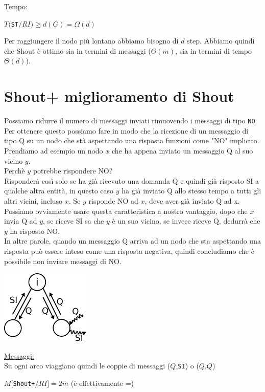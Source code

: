 \underline{Tempo:}
\begin{center}
    $T($\texttt{ST}$/RI) \geq d(G) = \Omega(d)$
\end{center}
Per raggiungere il nodo più lontano abbiamo bisogno di $d$ step. Abbiamo quindi
che Shout è ottimo sia in termini di messaggi ($\Theta(m)$, sia in termini di
tempo $\Theta(d)$).

\section{Shout+ miglioramento di Shout}
Possiamo ridurre il numero di messaggi inviati rimuovendo i messaggi di tipo
\texttt{NO}. Per ottenere questo possiamo fare in modo che la ricezione di un
messaggio di tipo Q su un nodo che stà aspettando una risposta funzioni come
"NO" implicito.\\
Prendiamo ad esempio un nodo $x$ che ha appena inviato un messaggio Q al suo
vicino $y$.\\ Perchè $y$ potrebbe rispondere NO? \\Risponderà così solo se ha
già ricevuto una domanda Q e quindi già risposto SI a qualche altra entità, in
questo caso $y$ ha già inviato Q allo stesso tempo a tutti gli altri vicini,
incluso $x$. Se $y$ risponde NO ad $x$, deve aver già inviato Q ad x. Possiamo
ovviamente usare questa caratteristica a nostro vantaggio, dopo che $x$ invia Q
ad $y$, se riceve SI sa che $y$ è un suo vicino, se invece riceve Q, dedurrà che
$y$ ha risposto NO.\\
In altre parole, quando un messaggio Q arriva ad un nodo che sta aspettando una
risposta può essere inteso come una risposta negativa, quindi concludiamo che è
possibile non inviare messaggi di NO.
\begin{center}
    \includegraphics[scale=1.4]{images/n_23}
\end{center}
\underline{Messaggi:}\\
Su ogni arco viaggiano quindi le coppie di messaggi ($Q$,\texttt{SI}) o
($Q$,$Q$)

\begin{center}
    $M[$\texttt{Shout+}$/RI] = 2m$ (è effettivamente =)\\
\end{center}


